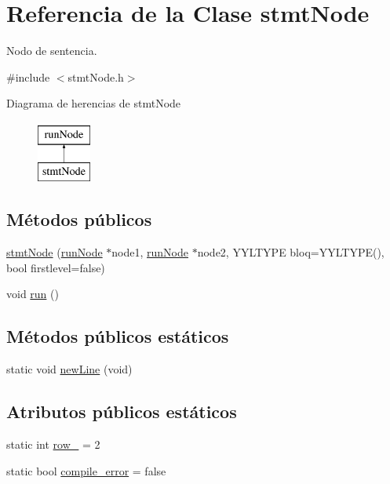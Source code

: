 \hypertarget{classstmtNode}{\section{Referencia de la Clase stmt\-Node}
\label{classstmtNode}
}


Nodo de sentencia.  




{\ttfamily \#include $<$stmt\-Node.\-h$>$}

Diagrama de herencias de stmt\-Node\begin{figure}[H]
\begin{center}
\leavevmode
\includegraphics[height=2.000000cm]{classstmtNode}
\end{center}
\end{figure}
\subsection*{Métodos públicos}
\begin{DoxyCompactItemize}
\item 
\hyperlink{classstmtNode_ac71c29f617015a7ce9441fbb5b4e7052}{stmt\-Node} (\hyperlink{classrunNode}{run\-Node} $\ast$node1, \hyperlink{classrunNode}{run\-Node} $\ast$node2, Y\-Y\-L\-T\-Y\-P\-E bloq=Y\-Y\-L\-T\-Y\-P\-E(), bool firstlevel=false)
\item 
void \hyperlink{classstmtNode_a3af40723e5e98718eacc7ac7935b281b}{run} ()
\end{DoxyCompactItemize}
\subsection*{Métodos públicos estáticos}
\begin{DoxyCompactItemize}
\item 
static void \hyperlink{classstmtNode_a08d12bc2ec45075d8693f26a5cae8ead}{new\-Line} (void)
\end{DoxyCompactItemize}
\subsection*{Atributos públicos estáticos}
\begin{DoxyCompactItemize}
\item 
static int \hyperlink{classstmtNode_a5238bce92ef57e15abd5eacdd4c7cbae}{row\-\_\-} = 2
\item 
static bool \hyperlink{classstmtNode_aa1f2b53dbf57a8030442f44de541e6bc}{compile\-\_\-error} = false
\end{DoxyCompactItemize}


